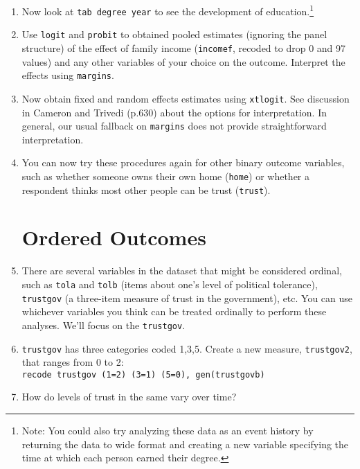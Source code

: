 \documentclass[a4paper,12pt]{article}
\begin{document}
\begin{enumerate}
\item Now look at \texttt{tab degree year} to see the development of education.\footnote{Note: You could also try analyzing these data as an event history by returning the data to wide format and creating a new variable specifying the time at which each person earned their degree.}

\item Use \texttt{logit} and \texttt{probit} to obtained pooled estimates (ignoring the panel structure) of the effect of family income (\texttt{incomef}, recoded to drop 0 and 97 values) and any other variables of your choice on the outcome. Interpret the effects using \texttt{margins}.

\item Now obtain fixed and random effects estimates using \texttt{xtlogit}. See discussion in Cameron and Trivedi (p.630) about the options for interpretation. In general, our usual fallback on \texttt{margins} does not provide straightforward interpretation.








\item You can now try these procedures again for other binary outcome variables, such as whether someone owns their own home (\texttt{home}) or whether a respondent thinks most other people can be trust (\texttt{trust}).

\section{Ordered Outcomes}

\item There are several variables in the dataset that might be considered ordinal, such as \texttt{tola} and \texttt{tolb} (items about one's level of political tolerance), \texttt{trustgov} (a three-item measure of trust in the government), etc. You can use whichever variables you think can be treated ordinally to perform these analyses. We'll focus on the \texttt{trustgov}.

\item \texttt{trustgov} has three categories coded 1,3,5. Create a new measure, \texttt{trustgov2}, that ranges from 0 to 2:\\
\texttt{recode trustgov (1=2) (3=1) (5=0), gen(trustgovb)}

\item How do levels of trust in the same vary over time?


\end{enumerate}
\end{document}
